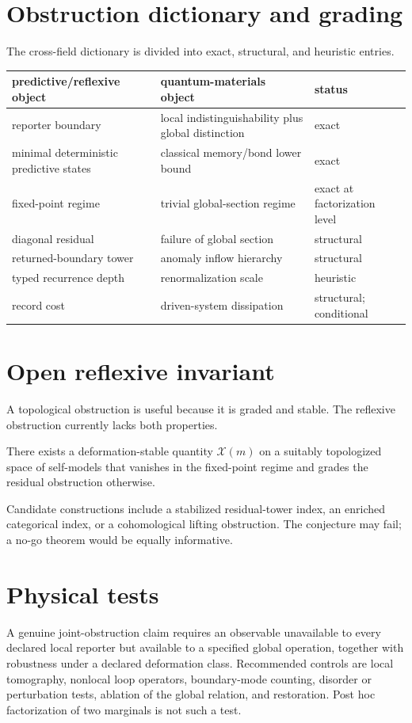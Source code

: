 \documentclass[11pt,a4paper]{article}
\begin{document}
\section{Obstruction dictionary and grading}
The cross-field dictionary is divided into exact, structural, and heuristic entries.
\begin{longtable}{p{.31\linewidth}p{.35\linewidth}p{.19\linewidth}}
\toprule
predictive/reflexive object & quantum-materials object & status\\\midrule
reporter boundary & local indistinguishability plus global distinction & exact\\
minimal deterministic predictive states & classical memory/bond lower bound & exact\\
fixed-point regime & trivial global-section regime & exact at factorization level\\
diagonal residual & failure of global section & structural\\
returned-boundary tower & anomaly inflow hierarchy & structural\\
typed recurrence depth & renormalization scale & heuristic\\
record cost & driven-system dissipation & structural; conditional\\
\bottomrule
\end{longtable}

\section{Open reflexive invariant}
A topological obstruction is useful because it is graded and stable. The reflexive obstruction currently lacks both properties.
\begin{conjecture}
There exists a deformation-stable quantity $\mathcal X(m)$ on a suitably topologized space of self-models that vanishes in the fixed-point regime and grades the residual obstruction otherwise.
\end{conjecture}
Candidate constructions include a stabilized residual-tower index, an enriched categorical index, or a cohomological lifting obstruction. The conjecture may fail; a no-go theorem would be equally informative.

\section{Physical tests}
A genuine joint-obstruction claim requires an observable unavailable to every declared local reporter but available to a specified global operation, together with robustness under a declared deformation class. Recommended controls are local tomography, nonlocal loop operators, boundary-mode counting, disorder or perturbation tests, ablation of the global relation, and restoration. Post hoc factorization of two marginals is not such a test.
\end{document}
